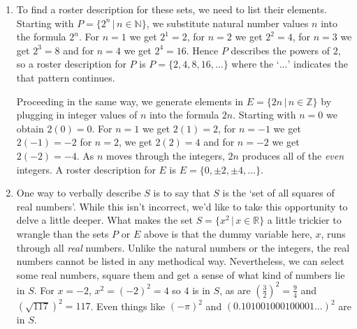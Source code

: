 {
\begin{enumerate}

\item  To find a roster description for these sets, we need to list their elements.   Starting with $P = \{ 2^{n} \, | \, n \in \mathbb{N} \}$, we substitute natural number values $n$ into the formula $2^n$.  For $n = 1$ we get $2^1 = 2$,  for $n = 2$ we get $2^2 = 4$, for $n = 3$ we get $2^3 = 8$ and for $n = 4$ we get $2^4 = 16$.  Hence  $P$ describes the powers of $2$, so a roster description for $P$ is $P = \{ 2, 4, 8, 16, \ldots \}$ where the `$\ldots$' indicates the that pattern continues.


\smallskip

Proceeding in the same way, we generate elements in $E = \{ 2n \, | \, n \in \mathbb Z \}$ by plugging in integer values of $n$ into the formula $2n$.  Starting with $n = 0$ we obtain $2(0) = 0$.  For $n = 1$ we get $2(1) = 2$, for $n = -1$ we get $2(-1) = -2$ for $n = 2$, we get $2(2) = 4$ and for $n = -2$ we get $2(-2) = -4$.  As $n$  moves through the integers, $2n$ produces all of the \textit{even} integers. A roster description for  $E$ is $E = \{ 0, \pm 2, \pm 4, \ldots \}$.


\item  One way to verbally describe $S$ is to say that $S$ is the `set of all squares of real numbers'.  While this isn't incorrect, we'd like to take this opportunity to delve a little deeper.  What makes the set $S = \{ x^2 \, | \, x \in \mathbb{R} \}$ a little trickier to wrangle than the sets $P$ or $E$ above is that the dummy variable here, $x$, runs through all \textit{real} numbers.  Unlike the natural numbers or the integers, the real numbers cannot be listed in any methodical way. Nevertheless, we can select some real numbers, square them and get a sense of what kind of numbers lie in $S$.  For $x = -2$, $x^2 = (-2)^2 = 4$ so $4$ is in $S$, as are $\left(\frac{3}{2}\right)^2 = \frac{9}{4}$ and $(\sqrt{117})^2 = 117$.  Even things like $(-\pi)^2$ and $(0.101001000100001 \ldots)^2$ are in $S$.  


\end{enumerate}}
